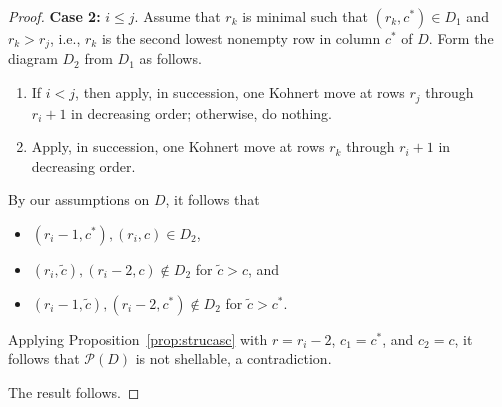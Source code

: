 \documentclass[letterpaper,10pt]{article}
\begin{document}
\begin{proof}
    \noindent
    \textbf{Case 2:}  $i\le j$. Assume that $r_k$ is minimal such that $(r_k,c^*)\in D_1$ and $r_k>r_j$, i.e., $r_k$ is the second lowest nonempty row in column $c^*$ of $D$. Form the diagram $D_2$ from $D_1$ as follows. 
    \begin{enumerate}
        \item[1)] If $i<j$, then apply, in succession, one Kohnert move at rows $r_j$ through $r_i+1$ in decreasing order; otherwise, do nothing.
        \item[2)] Apply, in succession, one Kohnert move at rows $r_k$ through $r_i+1$ in decreasing order.
    \end{enumerate}
    By our assumptions on $D$, it follows that
    \begin{itemize}
        \item $(r_i-1,c^*),(r_i,c)\in D_2$,
        \item $(r_i,\tilde{c}),(r_i-2,c)\notin D_2$ for $\tilde{c}>c$, and
        \item $(r_i-1,\tilde{c}),(r_i-2,c^*)\notin D_2$ for $\tilde{c}>c^*$.
    \end{itemize}
    Applying Proposition~\ref{prop:strucasc} with $r=r_i-2$, $c_1=c^*$, and $c_2=c$, it follows that $\mathcal{P}(D)$ is not shellable, a contradiction.
    \bigskip

    \noindent
    The result follows.
\end{proof}
\end{document}
